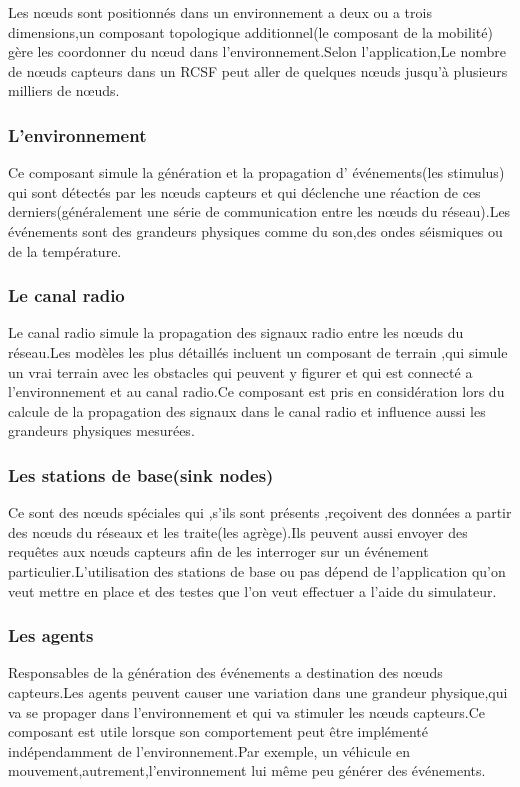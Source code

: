 Les nœuds sont positionnés dans un environnement a deux ou a trois dimensions,un composant topologique additionnel(le composant de la mobilité) gère les coordonner du nœud dans l'environnement.Selon l'application,Le nombre de nœuds capteurs dans un RCSF  peut aller de quelques nœuds jusqu'à plusieurs milliers de nœuds.
\subsubsection{L'environnement}
Ce composant simule la génération et la propagation d' événements(les stimulus) qui sont détectés par les nœuds capteurs et qui déclenche une réaction de ces derniers(généralement une série de communication entre les nœuds du réseau).Les événements sont des grandeurs physiques comme du son,des ondes séismiques ou de la température.
\subsubsection{Le canal radio}
Le canal radio  simule la propagation des signaux radio entre les nœuds du réseau.Les modèles les plus détaillés incluent un composant de terrain ,qui simule un vrai terrain avec les obstacles qui peuvent y figurer et qui est connecté a l'environnement et au canal radio.Ce composant est pris en considération lors du calcule de la propagation des signaux dans le canal radio et influence aussi les grandeurs physiques mesurées.

\subsubsection{Les stations de base(sink nodes)}
Ce sont des nœuds spéciales qui ,s'ils sont présents ,reçoivent des données a partir des nœuds du réseaux et les traite(les agrège).Ils peuvent aussi envoyer des requêtes aux nœuds capteurs
afin de les interroger sur un événement particulier.L'utilisation des stations de base ou pas dépend de l'application qu'on veut mettre en place et des testes que l'on veut effectuer a l'aide du simulateur.

\subsubsection{Les agents}
Responsables de la génération des événements a destination des nœuds capteurs.Les agents peuvent causer une variation dans une grandeur physique,qui va se propager dans l'environnement et qui va stimuler les nœuds capteurs.Ce composant est utile lorsque son comportement peut être implémenté indépendamment de  l'environnement.Par exemple, un véhicule en mouvement,autrement,l'environnement lui même peu générer des événements. 

